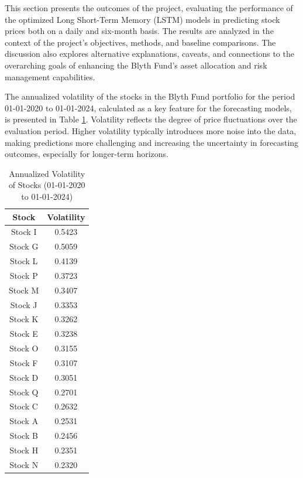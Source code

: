 \documentclass[10pt,twocolumn]{article}
\begin{document}
This section presents the outcomes of the project, evaluating the performance of the optimized Long Short-Term Memory (LSTM) models in predicting stock prices both on a daily and six-month basis. The results are analyzed in the context of the project's objectives, methods, and baseline comparisons. The discussion also explores alternative explanations, caveats, and connections to the overarching goals of enhancing the Blyth Fund’s asset allocation and risk management capabilities.

The annualized volatility of the stocks in the Blyth Fund portfolio for the period 01-01-2020 to 01-01-2024, calculated as a key feature for the forecasting models, is presented in Table \ref{tab:stock_volatility}. Volatility reflects the degree of price fluctuations over the evaluation period. Higher volatility typically introduces more noise into the data, making predictions more challenging and increasing the uncertainty in forecasting outcomes, especially for longer-term horizons.

\begin{table}[htbp]
    \centering
    \caption{Annualized Volatility of Stocks (01-01-2020 to 01-01-2024)}
    \label{tab:stock_volatility}
    \begin{tabular}{|c|c|}
        \hline
        \textbf{Stock} & \textbf{Volatility} \\
        \hline
        Stock I  & 0.5423 \\
        Stock G  & 0.5059 \\
        Stock L  & 0.4139 \\
        Stock P  & 0.3723 \\
        Stock M  & 0.3407 \\
        Stock J  & 0.3353 \\
        Stock K  & 0.3262 \\
        Stock E  & 0.3238 \\
        Stock O  & 0.3155 \\
        Stock F  & 0.3107 \\
        Stock D  & 0.3051 \\
        Stock Q  & 0.2701 \\
        Stock C  & 0.2632 \\
        Stock A  & 0.2531 \\
        Stock B  & 0.2456 \\
        Stock H  & 0.2351 \\
        Stock N  & 0.2320 \\
        \hline
    \end{tabular}
\end{table}
\end{document}
